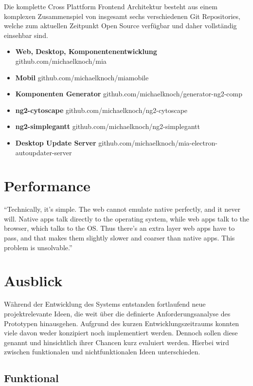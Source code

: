 Die komplette Cross Plattform Frontend Architektur besteht aus einem komplexen Zusammenspiel von insgesamt sechs verschiedenen Git Repositories,
welche zum aktuellen Zeitpunkt Open Source verfügbar und daher vollständig einsehbar sind.

\begin{itemize}
  \item{\textbf{Web, Desktop, Komponentenentwicklung} github.com/michaelknoch/mia}
  \item{\textbf{Mobil} github.com/michaelknoch/miamobile}
  \item{\textbf{Komponenten Generator} github.com/michaelknoch/generator-ng2-comp}
  \item{\textbf{ng2-cytoscape} github.com/michaelknoch/ng2-cytoscape}
  \item{\textbf{ng2-simplegantt} github.com/michaelknoch/ng2-simplegantt}
  \item{\textbf{Desktop Update Server} github.com/michaelknoch/mia-electron-autoupdater-server}
\end{itemize}


\section{Performance}

``Technically, it’s simple. The web cannot emulate native perfectly, and it never will.
Native apps talk directly to the operating system, while web apps talk to the browser,
which talks to the OS. Thus there’s an extra layer web apps have to pass, and that makes them slightly slower and
coarser than native apps.
This problem is unsolvable.'' \cite{Webvs43:online}

\vspace{0.3cm}


\section{Ausblick}

Während der Entwicklung des Systems entstanden fortlaufend neue projektrelevante Ideen,
die weit über die definierte Anforderungsanalyse des Prototypen hinausgehen.
Aufgrund des kurzen Entwicklungszeitraums konnten viele davon weder konzipiert noch implementiert werden.
Dennoch sollen diese genannt und hinsichtlich ihrer Chancen kurz evaluiert werden.
Hierbei wird zwischen funktionalen und nichtfunktionalen Ideen unterschieden.

\subsection{Funktional}

